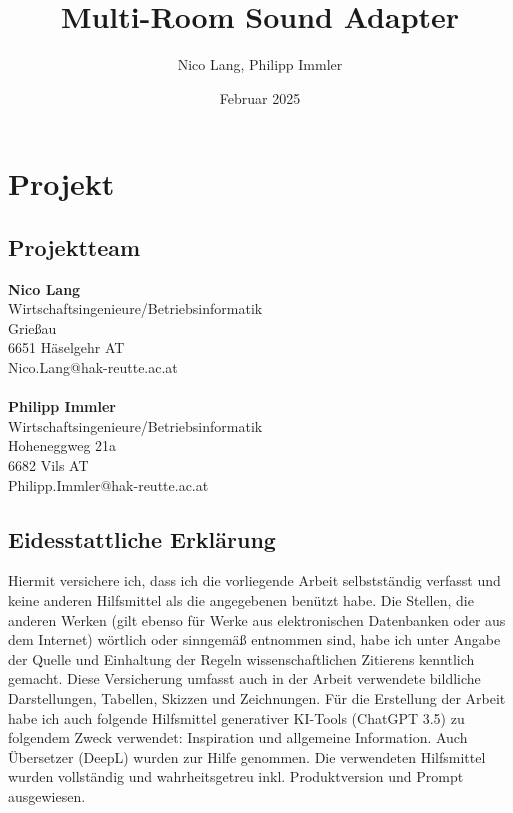 \documentclass[]{article}
\title{\textbf{Multi-Room Sound Adapter}}
\author{Nico Lang, Philipp Immler}
\date{Februar 2025}
\begin{document}
\maketitle
\thispagestyle{empty}

\pagebreak

\section{Projekt}
\subsection{Projektteam}
\textbf{Nico Lang}\\
Wirtschaftsingenieure/Betriebsinformatik\\
Grießau\\
6651 Häselgehr AT\\
Nico.Lang@hak-reutte.ac.at\\
\\
\textbf{Philipp Immler}\\
Wirtschaftsingenieure/Betriebsinformatik\\
Hoheneggweg 21a\\
6682 Vils AT\\
Philipp.Immler@hak-reutte.ac.at

\pagebreak

\subsection{Eidesstattliche Erklärung}
Hiermit versichere ich, dass ich die vorliegende Arbeit selbstständig verfasst und keine anderen Hilfsmittel als die angegebenen benützt habe. Die Stellen, die anderen Werken (gilt ebenso für Werke aus elektronischen Datenbanken oder aus dem Internet) wörtlich oder sinngemäß entnommen sind, habe ich unter Angabe der Quelle und Einhaltung der Regeln wissenschaftlichen Zitierens kenntlich gemacht. Diese Versicherung umfasst auch in der Arbeit verwendete bildliche Darstellungen, Tabellen, Skizzen und Zeichnungen. Für die Erstellung der Arbeit habe ich auch folgende Hilfsmittel generativer KI-Tools (ChatGPT 3.5) zu folgendem Zweck verwendet: Inspiration und allgemeine Information. Auch Übersetzer (DeepL) wurden zur Hilfe genommen. Die verwendeten Hilfsmittel wurden vollständig und wahrheitsgetreu inkl. Produktversion und Prompt ausgewiesen.\\

\vspace{30mm}
\end{document}
